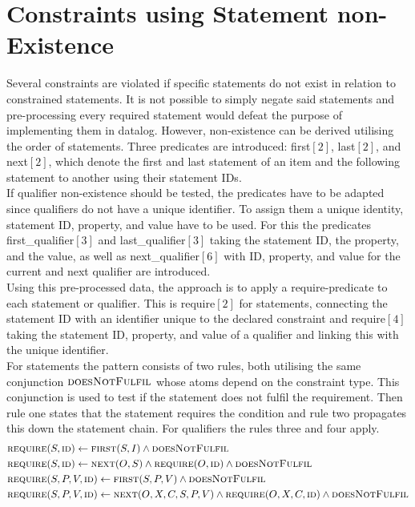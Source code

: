 \documentclass[hyperref,bachelorofscience,fleqn]{cgvpub}
\begin{document}
\section{Constraints using Statement non-Existence}\label{sec_constraints_using_statement_non}
Several constraints are violated if specific statements do not exist in relation to constrained statements. It is not possible to simply negate said statements and pre-processing every required statement would defeat the purpose of implementing them in datalog. However, non-existence can be derived utilising the order of statements. Three predicates are introduced: first\([2]\), last\([2]\), and next\([2]\), which denote the first and last statement of an item and the following statement to another using their statement IDs.\\

If qualifier non-existence should be tested, the predicates have to be adapted since qualifiers do not have a unique identifier. To assign them a unique identity, statement ID, property, and value have to be used. For this the predicates first\_qualifier\([3]\) and last\_qualifier\([3]\) taking the statement ID, the property, and the value, as well as next\_qualifier\([6]\) with ID, property, and value for the current and next qualifier are introduced.\\

Using this pre-processed data, the approach is to apply a require-predicate to each statement or qualifier. This is require\([2]\) for statements, connecting the statement ID with an identifier unique to the declared constraint and require\([4]\) taking the statement ID, property, and value of a qualifier and linking this with the unique identifier.\\

For statements the pattern consists of two rules, both utilising the same conjunction \(\textsc{doesNotFulfil}\) whose atoms depend on the constraint type. This conjunction is used to test if the statement does not fulfil the requirement. Then rule one states that the statement requires the condition and rule two propagates this down the statement chain. For qualifiers the rules three and four apply.
\begin{align}
&\textsc{require}(S, \textsc{id}) \leftarrow \textsc{first}(S, I) \wedge \textsc{doesNotFulfil} \\
&\textsc{require}(S, \textsc{id}) \leftarrow \textsc{next}(O, S) \wedge \textsc{require}(O, \textsc{id}) \wedge \textsc{doesNotFulfil} \\
&\textsc{require}(S, P, V, \textsc{id}) \leftarrow \textsc{first}(S, P, V) \wedge \textsc{doesNotFulfil} \\
&\textsc{require}(S, P, V, \textsc{id}) \leftarrow \textsc{next}(O, X, C, S, P, V) \wedge \textsc{require}(O, X, C, \textsc{id}) \wedge \textsc{doesNotFulfil}
\end{align}
\end{document}
